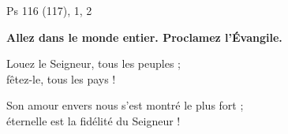 Ps 116 (117), 1, 2

\textbf{
Allez dans le monde entier.
Proclamez l’Évangile.}

\smallskip

Louez le Seigneur, tous les peuples ;\\
fêtez-le, tous les pays !

\smallskip

Son amour envers nous s’est montré le plus fort ;\\
éternelle est la fidélité du Seigneur !

